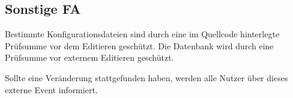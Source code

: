 \subsection{Sonstige FA}
    \begin{requirements}
         Bestimmte Konfigurationsdateien sind durch eine im Quellcode hinterlegte Prüfsumme vor dem Editieren geschützt.
         Die Datenbank wird durch eine Prüfsumme vor externem Editieren geschützt.
        \begin{requirements}
             Sollte eine Veränderung stattgefunden haben, werden alle Nutzer über dieses externe Event informiert.
        \end{requirements}
    \end{requirements}

